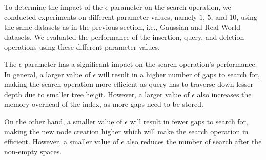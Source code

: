 To determine the impact of the $\epsilon$ parameter on the search operation, we conducted experiments on different parameter values, namely $1$, $5$, and $10$, using the same datasets as in the previous section, i.e., Gaussian and Real-World datasets. We evaluated the performance of the insertion, query, and deletion operations using these different parameter values.

The $\epsilon$ parameter has a significant impact on the search operation's performance. In general, a larger value of $\epsilon$ will result in a higher number of gaps to search for, making the search operation more efficient as query has to traverse down lesser depth due to smaller tree heigit. However, a larger value of $\epsilon$ also increases the memory overhead of the index, as more gaps need to be stored. 

On the other hand, a smaller value of $\epsilon$ will result in fewer gaps to search for, making the new node creation higher which will make the search operation in efficient. However, a smaller value of $\epsilon$ also reduces the number of search after the non-empty spaces.


